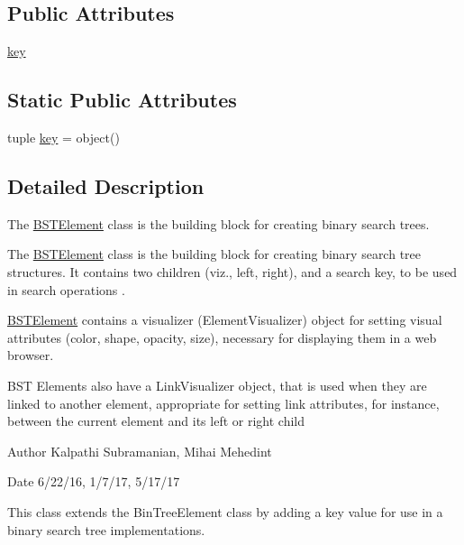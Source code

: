 \subsection*{Public Attributes}
\begin{DoxyCompactItemize}
\item 
\hyperlink{classbridges_1_1bst__element_1_1_b_s_t_element_a8b4c0d8d6a2a7e0fefb013038d26f146}{key}
\end{DoxyCompactItemize}
\subsection*{Static Public Attributes}
\begin{DoxyCompactItemize}
\item 
tuple \hyperlink{classbridges_1_1bst__element_1_1_b_s_t_element_a4b0e38f930804e26f5609c0130b63ddf}{key} = object()
\end{DoxyCompactItemize}


\subsection{Detailed Description}
The \hyperlink{classbridges_1_1bst__element_1_1_b_s_t_element}{B\+S\+T\+Element} class is the building block for creating binary search trees. 

The \hyperlink{classbridges_1_1bst__element_1_1_b_s_t_element}{B\+S\+T\+Element} class is the building block for creating binary search tree structures. It contains two children (viz., left, right), and a search key, to be used in search operations .

\hyperlink{classbridges_1_1bst__element_1_1_b_s_t_element}{B\+S\+T\+Element} contains a visualizer (Element\+Visualizer) object for setting visual attributes (color, shape, opacity, size), necessary for displaying them in a web browser.

B\+S\+T Elements also have a Link\+Visualizer object, that is used when they are linked to another element, appropriate for setting link attributes, for instance, between the current element and its left or right child

\begin{DoxyAuthor}{Author}
Kalpathi Subramanian, Mihai Mehedint
\end{DoxyAuthor}
\begin{DoxyDate}{Date}
6/22/16, 1/7/17, 5/17/17
\end{DoxyDate}
This class extends the Bin\+Tree\+Element class by adding a \textquotesingle{}key\textquotesingle{} value for use in a binary search tree implementations. 

